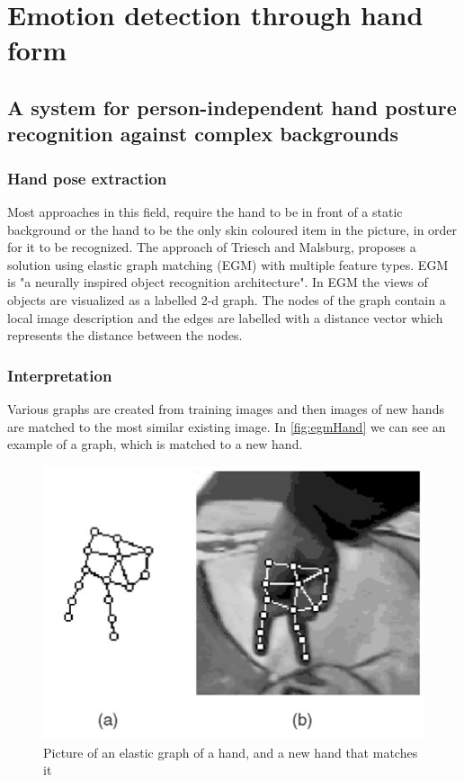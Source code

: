 \documentclass[conference]{IEEEtran}
\begin{document}
\section{Emotion detection through hand form}
\label{sec:emotionHand}
\subsection{A system for person-independent hand posture recognition against complex backgrounds}
\subsubsection{Hand pose extraction}
Most approaches in this field, require the hand to be in front of a static background or the hand to be the only skin coloured item in the picture, in order for it to be recognized\cite{cui1995learning,hunter1995posture,kohler1997technical,min1999visual}. The approach of Triesch and Malsburg\cite{triesch2001system}, proposes a solution using elastic graph matching (EGM) with multiple feature types. EGM is "a neurally inspired object recognition architecture"\cite{lades1993distortion}. In EGM the views of objects are visualized as a labelled 2-d graph. The nodes of the graph contain a local image description and the edges are labelled with a distance vector which represents the distance between the nodes. 


\subsubsection{Interpretation}
Various graphs are created from training images and then images of new hands are matched to the most similar existing image. In \autoref{fig:egmHand} we can see an example of a graph, which is matched to a new hand.
\begin{figure}[H]
\centering
\includegraphics[width=\linewidth]{egmHand.jpg}
\caption{Picture of an elastic graph of a hand, and a new hand that matches it\cite{triesch2001system}}
\label{fig:egmHand}
\end{figure}
\end{document}
